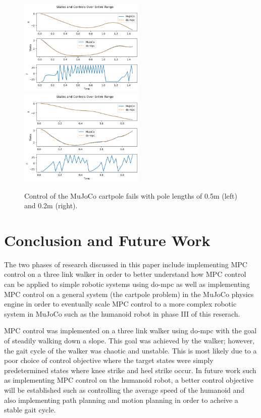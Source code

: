 \documentclass{./springer/svjour3}
\begin{document}
\begin{figure}[!h]
  \centering
  \includegraphics[width=6cm]{./figures/cartpole_mjpc_times_0.5.png} %
  \includegraphics[width=6cm]{./figures/cartpole_mjpc_times_0.2.png} %
  \caption{Control of the MuJoCo cartpole fails with pole lengths of 0.5m (left) and 0.2m (right).}
  \label{fig:cartpole_fail}
\end{figure}

\section{Conclusion and Future Work}
The two phases of research discussed in this paper include implementing MPC control on a three link walker in order to 
better understand how MPC control can be applied to simple robotic systems using do-mpc as well as 
implementing MPC control on a general system (the cartpole problem) in the MuJoCo physics engine in order to eventually scale MPC control to a more 
complex robotic system in MuJoCo such as the humanoid robot in phase III of this reserach. 

MPC control was implemented on a three link walker using do-mpc with the goal of steadily walking down a slope. This goal was achieved by the walker; however,
the gait cycle of the walker was chaotic and unstable. This is most likely due to a poor choice of control objective where the target states were simply predetermined 
states where knee strike and heel strike occur. In future work such as implementing MPC control on the humanoid robot, a better control objective will be established such as 
controlling the average speed of the humanoid and also implementing path planning and motion planning in order to acheive a stable gait cycle.
\end{document}

